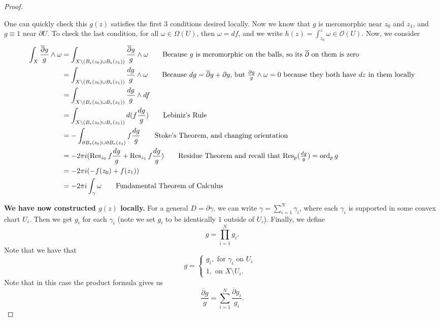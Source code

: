 \documentclass{article}
\begin{document}
{\begin{proof}
\begin{enumerate}
        One can quickly check this $g(z)$ satisfies the first $3$ conditions desired locally. Now we know that $g$ is meromorphic near $z_0$ and $z_1$, and $g \equiv 1$ near $\partial U$. To check the last condition, for all $\omega \in \Omega(U)$, then $\omega = df$, and we write $h(z) = \int_{z_0}^z \omega \in \mathcal{O}(U)$. Now, we consider
        \allowdisplaybreaks
    \begin{align*}
        \int_{X} \frac{\overline{\partial} g}{g} \wedge \omega &= \int_{X \setminus (B_\epsilon(z_0) \cup B_\epsilon(z_1))} \frac{\overline{\partial} g}{g} \wedge \omega \tag*{Because $g$ is meromorphic on the balls, so its $\overline{\partial}$ on them is zero}\\
        &= \int_{X \setminus (B_\epsilon(z_0) \cup B_\epsilon(z_1))} \frac{d g}{g} \wedge \omega \tag*{Because $dg = \overline{\partial} g + \partial g$, but $\frac{\partial g}{g} \wedge \omega = 0$ because they both have $dz$ in them locally}\\
        &= \int_{X \setminus (B_\epsilon(z_0) \cup B_\epsilon(z_1))} \frac{d g}{g} \wedge df\\
        &= \int_{X \setminus (B_\epsilon(z_0) \cup B_\epsilon(z_1))} d(f \frac{dg}{g}) \tag*{Lebiniz's Rule}\\
        &= - \int_{\partial B_\epsilon(z_0) \cup \partial B_\epsilon(z_1)} f \frac{dg}{g} \tag*{Stoke's Theorem, and changing orientation}\\
        &=  - 2\pi i (\operatorname{Res}_{z_0} f \frac{dg}{g} + \operatorname{Res}_{z_1} f \frac{dg}{g})  \tag*{Residue Theorem and recall that $\operatorname{Res}_p(\frac{dg}{g}) = \ord_p g$}\\
        &= - 2\pi i (-f(z_0) + f(z_1))\\
        &= - 2\pi i \int_\gamma \omega \tag*{Fundamental Theorem of Calculus}
    \end{align*}
    \end{enumerate}
    \textbf{We have now constructed $g(z)$ locally.} For a general $D = \partial \gamma$, we can write $\gamma = \sum_{i = 1}^N \gamma_i$, where each $\gamma_i$ is supported in some convex chart $U_i$. Then we get $g_i$ for each $\gamma_i$ (note we set $g_i$ to be identically $1$ outside of $U_i$). Finally, we define
    \[g = \prod_{i = 1}^N g_i.\]
    Note that we have that
    \[g = \begin{cases}
        g_i, \text{ for $\gamma_i$ on $U_i$ }\\
        1, \text{ on $X \setminus U_i$}.
    \end{cases}\]
    Note that in this case the product formula gives us
    \[\frac{\overline{\partial} g}{g} = \sum_{i = 1}^N \frac{\overline{\partial} g_i}{g_i}.\]


\end{proof}}
\end{document}
